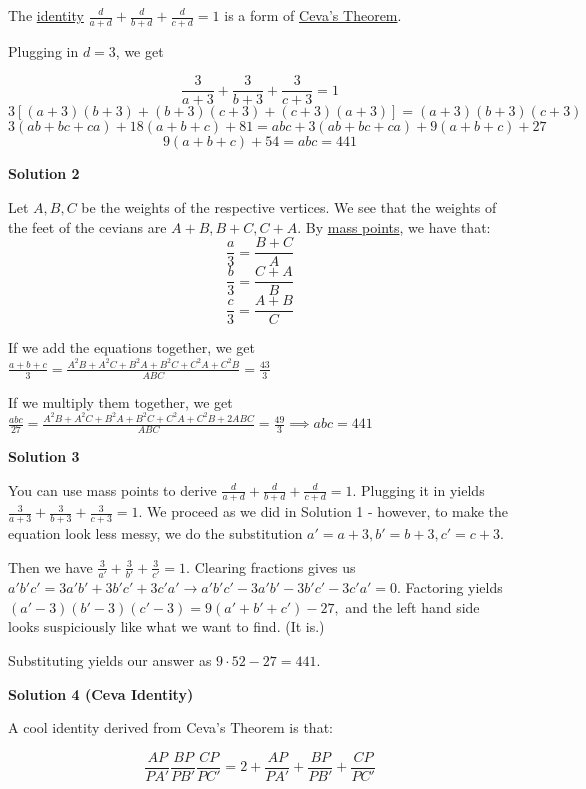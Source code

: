 \begin{enumerate}
 The \href{https://artofproblemsolving.com/wiki/index.php?title=Identity}{identity} $\frac {d}{a + d} + \frac {d}{b + d} + \frac {d}{c + d} = 1$ is a form of \href{https://artofproblemsolving.com/wiki/index.php?title=Ceva\%27s\_Theorem}{Ceva's Theorem}. 

 Plugging in $d = 3$, we get 

 
 \[\frac{3}{a + 3} + \frac{3}{b + 3} + \frac{3}{c+3} = 1\]
 \[3[(a + 3)(b + 3) + (b + 3)(c + 3) + (c + 3)(a + 3)] = (a+3)(b+3)(c+3)\]
 \[3(ab + bc + ca) + 18(a + b + c) + 81 = abc + 3(ab + bc + ca) + 9(a + b + c) + 27\]
 \[9(a + b + c) + 54 = abc=\boxed{441}\]




\textbf{Solution 2}

Let $A,B,C$ be the weights of the respective vertices. We see that the weights of the feet of the cevians are $A+B,B+C,C+A$. By \href{https://artofproblemsolving.com/wiki/index.php?title=Mass\_points}{mass points}, we have that: 
 \[\dfrac{a}{3}=\dfrac{B+C}{A}\] 
 \[\dfrac{b}{3}=\dfrac{C+A}{B}\] 
 \[\dfrac{c}{3}=\dfrac{A+B}{C}\]

 If we add the equations together, we get $\frac{a+b+c}{3}=\frac{A^2B+A^2C+B^2A+B^2C+C^2A+C^2B}{ABC}=\frac{43}{3}$

 If we multiply them together, we get $\frac{abc}{27}=\frac{A^2B+A^2C+B^2A+B^2C+C^2A+C^2B+2ABC}{ABC}=\frac{49}{3} \implies abc=\boxed{441}$




\textbf{Solution 3}

You can use mass points to derive $\frac {d}{a + d} + \frac {d}{b + d} + \frac {d}{c + d}=1.$ Plugging it in yields $\frac{3}{a + 3} + \frac{3}{b + 3} + \frac{3}{c+3} = 1.$ We proceed as we did in Solution 1 - however, to make the equation look less messy, we do the substitution $a'=a+3,b'=b+3,c'=c+3.$

 Then we have $\frac{3}{a'}+\frac{3}{b'}+\frac{3}{c'}=1.$ Clearing fractions gives us $a'b'c'=3a'b'+3b'c'+3c'a'\to a'b'c'-3a'b'-3b'c'-3c'a'=0.$ Factoring yields $(a'-3)(b'-3)(c'-3)=9(a'+b'+c')-27,$ and the left hand side looks suspiciously like what we want to find. (It is.)

 Substituting yields our answer as $9\cdot 52-27=\boxed{441}.$




\textbf{Solution 4 (Ceva Identity)}

A cool identity derived from Ceva's Theorem is that:

 
 \[\frac{AP}{PA'}\frac{BP}{PB'}\frac{CP}{PC'} = 2 + \frac{AP}{PA'} + \frac{BP}{PB'} + \frac{CP}{PC'}\]


\end{enumerate}
